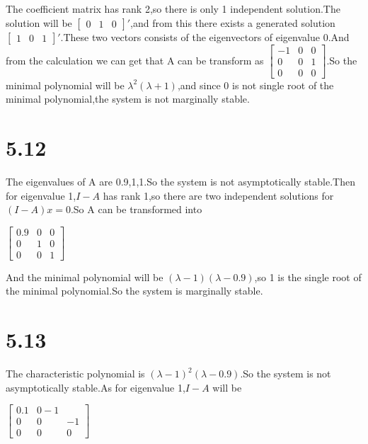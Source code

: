 \documentclass{article}
\begin{document}
The coefficient matrix has rank 2,so there is only 1 independent solution.The solution will be $\left[\begin{array}{lll}0 & 1 & 0\end{array}\right]'$,and from this there exists a generated solution $\left[\begin{array}{lll} 1 & 0 & 1\end{array}\right]'$.These two vectors consists of the eigenvectors of eigenvalue 0.And from the calculation we can get that A can be transform as $\left[\begin{array}{lll}-1 & 0 & 0\\0 & 0 & 1\\0 & 0 & 0\end{array}\right]$.So the minimal polynomial will be $\lambda^2(\lambda+1)$,and since 0 is not single root of the minimal polynomial,the system is not marginally stable.\\

\section*{5.12}
The eigenvalues of A are 0.9,1,1.So the system is not asymptotically stable.Then for eigenvalue 1,$I-A$ has rank 1,so there are two independent solutions for $(I-A)x=0$.So A can be transformed into\\
\begin{center}
    $\left[\begin{array}{lll}0.9 & 0 & 0\\0 & 1 & 0\\ 0 & 0 & 1\end{array}\right]$
\end{center}

And the minimal polynomial will be $(\lambda-1)(\lambda-0.9)$,so 1 is the single root of the minimal polynomial.So the system is marginally stable.\\

\section*{5.13}

The characteristic polynomial is $(\lambda-1)^2(\lambda-0.9)$.So the system is not asymptotically stable.As for eigenvalue 1,$I-A$ will be\\
\begin{center}
    $\left[\begin{array}{lll}0.1 & 0 -1\\0 & 0 & -1 \\0 & 0 & 0\end{array}\right]$
\end{center}
\end{document}
